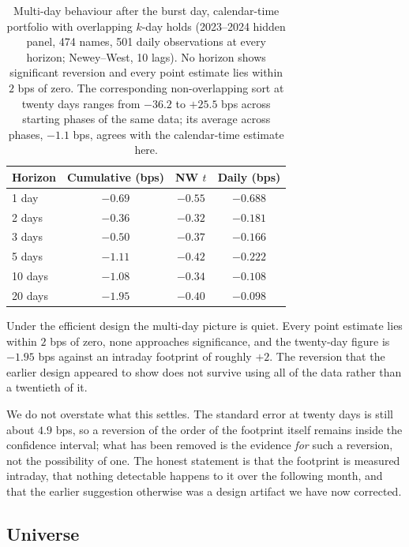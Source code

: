 \documentclass[11pt]{article}
\begin{document}
\begin{table}[htbp]
\centering
\begin{tabular}{lccc}
\toprule
\textbf{Horizon} & \textbf{Cumulative (bps)} & \textbf{NW $t$} & \textbf{Daily (bps)} \\
\midrule
1 day & $-0.69$ & $-0.55$ & $-0.688$ \\
2 days & $-0.36$ & $-0.32$ & $-0.181$ \\
3 days & $-0.50$ & $-0.37$ & $-0.166$ \\
5 days & $-1.11$ & $-0.42$ & $-0.222$ \\
10 days & $-1.08$ & $-0.34$ & $-0.108$ \\
20 days & $-1.95$ & $-0.40$ & $-0.098$ \\
\bottomrule
\end{tabular}
\caption{Multi-day behaviour after the burst day, calendar-time portfolio with overlapping
$k$-day holds (2023--2024 hidden panel, 474 names, 501 daily observations at every horizon;
Newey--West, 10 lags). No horizon shows significant reversion and every point estimate lies
within $2$ bps of zero. The corresponding non-overlapping sort at twenty days ranges from
$-36.2$ to $+25.5$ bps across starting phases of the same data; its average across phases,
$-1.1$ bps, agrees with the calendar-time estimate here.}
\label{tab:multiday}
\end{table}

Under the efficient design the multi-day picture is quiet. Every point estimate lies within
$2$ bps of zero, none approaches significance, and the twenty-day figure is $-1.95$ bps
against an intraday footprint of roughly $+2$. The reversion that the earlier design appeared
to show does not survive using all of the data rather than a twentieth of it.

We do not overstate what this settles. The standard error at twenty days is still about
$4.9$ bps, so a reversion of the order of the footprint itself remains inside the confidence
interval; what has been removed is the evidence \emph{for} such a reversion, not the
possibility of one. The honest statement is that the footprint is measured intraday, that
nothing detectable happens to it over the following month, and that the earlier suggestion
otherwise was a design artifact we have now corrected.

\subsection{Universe}
\end{document}

